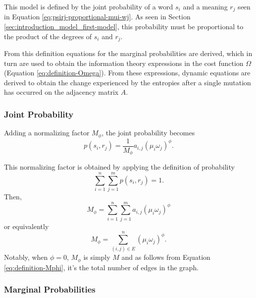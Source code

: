 This model is defined by the joint probability of a word $s_i$ and a meaning $r_j$ seen in Equation \eqref{eq:psirj-proportional-mui-wj}.
As seen in Section \ref{sec:introduction_model_first-model}, this probability must be proportional to the product of the degrees of $s_i$ and $r_j$.

From this definition equations for the marginal probabilities are derived, which in turn are used to obtain the information theory expressions in the cost function $\Omega$ (Equation \eqref{eq:definition-Omega}).
From these expressions, dynamic equations are derived to obtain the change experienced by the entropies after a single mutation has occurred on the adjacency matrix $A$.

\subsubsection{Joint Probability}

Adding a normalizing factor $M_\phi$, the joint probability becomes
\begin{equation}
  \label{eq:definition-psirj_first-model}
  p(s_i, r_j) = \frac{1}{M_\phi} a_{i,j} (\mu_i \omega_j)^\phi.
\end{equation}

This normalizing factor is obtained by applying the definition of probability
\begin{equation*}
  \sum_{i=1}^n \sum_{j=1}^m p(s_i, r_j) = 1.
\end{equation*}
Then,
\begin{equation*}
  M_\phi = \sum_{i=1}^n \sum_{j=1}^m a_{i,j} (\mu_i \omega_j)^\phi
\end{equation*}
or equivalently
\begin{equation}
  \label{eq:definition-Mphi}
  M_\phi = \sum_{(i,j) \in E}^n (\mu_i \omega_j)^\phi.
\end{equation}
Notably, when $\phi=0$, $M_\phi$ is simply $M$ and as follows from Equation \eqref{eq:definition-Mphi}, it's the total number of edges in the graph.

\subsubsection{Marginal Probabilities}

